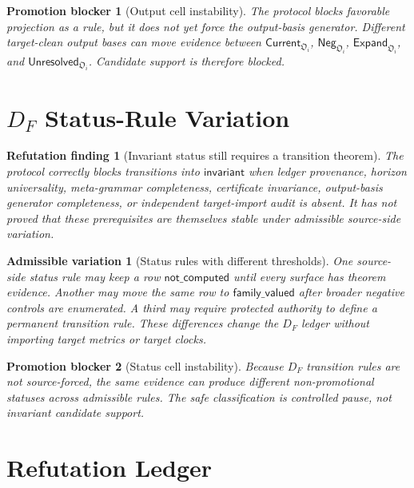 \documentclass[11pt]{article}
\newcommand{\OutFam}{\mathfrak{O}}
\newcommand{\Current}{\mathsf{Current}}
\newcommand{\Neg}{\mathsf{Neg}}
\newcommand{\Expand}{\mathsf{Expand}}
\newcommand{\Unres}{\mathsf{Unresolved}}
\newtheorem{finding}{Refutation finding}
\newtheorem{variation}{Admissible variation}
\newtheorem{blocker}{Promotion blocker}
\begin{document}
\begin{blocker}[Output cell instability]
The protocol blocks favorable projection as a rule, but it does not yet
force the output-basis generator. Different target-clean output bases can
move evidence between \(\Current_{\OutFam_i}\), \(\Neg_{\OutFam_i}\),
\(\Expand_{\OutFam_i}\), and \(\Unres_{\OutFam_i}\). Candidate support is
therefore blocked.
\end{blocker}

\section{\texorpdfstring{\(D_F\)}{DF} Status-Rule Variation}

\begin{finding}[Invariant status still requires a transition theorem]
The protocol correctly blocks transitions into \(\mathsf{invariant}\) when
ledger provenance, horizon universality, meta-grammar completeness,
certificate invariance, output-basis generator completeness, or independent
target-import audit is absent. It has not proved that these prerequisites
are themselves stable under admissible source-side variation.
\end{finding}

\begin{variation}[Status rules with different thresholds]
One source-side status rule may keep a row
\(\mathsf{not\_computed}\) until every surface has theorem evidence. Another
may move the same row to \(\mathsf{family\_valued}\) after broader negative
controls are enumerated. A third may require protected authority to define a
permanent transition rule. These differences change the \(D_F\) ledger
without importing target metrics or target clocks.
\end{variation}

\begin{blocker}[Status cell instability]
Because \(D_F\) transition rules are not source-forced, the same evidence
can produce different non-promotional statuses across admissible rules. The
safe classification is controlled pause, not invariant candidate support.
\end{blocker}

\section{Refutation Ledger}
\end{document}
